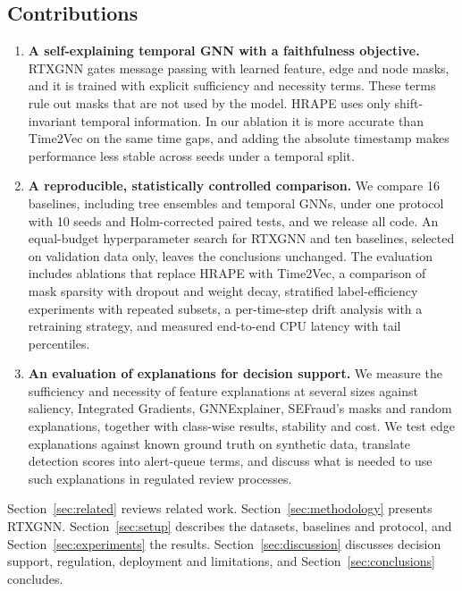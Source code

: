 \subsection*{Contributions}

\begin{enumerate}
\item \textbf{A self-explaining temporal GNN with a faithfulness objective.} RTXGNN gates message passing with learned feature, edge and node masks, and it is trained with explicit sufficiency and necessity terms. These terms rule out masks that are not used by the model. HRAPE uses only shift-invariant temporal information. In our ablation it is more accurate than Time2Vec on the same time gaps, and adding the absolute timestamp makes performance less stable across seeds under a temporal split.
\item \textbf{A reproducible, statistically controlled comparison.} We compare 16 baselines, including tree ensembles and temporal GNNs, under one protocol with 10 seeds and Holm-corrected paired tests, and we release all code. An equal-budget hyperparameter search for RTXGNN and ten baselines, selected on validation data only, leaves the conclusions unchanged. The evaluation includes ablations that replace HRAPE with Time2Vec, a comparison of mask sparsity with dropout and weight decay, stratified label-efficiency experiments with repeated subsets, a per-time-step drift analysis with a retraining strategy, and measured end-to-end CPU latency with tail percentiles.
\item \textbf{An evaluation of explanations for decision support.} We measure the sufficiency and necessity of feature explanations at several sizes against saliency, Integrated Gradients, GNNExplainer, SEFraud's masks and random explanations, together with class-wise results, stability and cost. We test edge explanations against known ground truth on synthetic data, translate detection scores into alert-queue terms, and discuss what is needed to use such explanations in regulated review processes.
\end{enumerate}

Section~\ref{sec:related} reviews related work. Section~\ref{sec:methodology} presents RTXGNN. Section~\ref{sec:setup} describes the datasets, baselines and protocol, and Section~\ref{sec:experiments} the results. Section~\ref{sec:discussion} discusses decision support, regulation, deployment and limitations, and Section~\ref{sec:conclusions} concludes.
